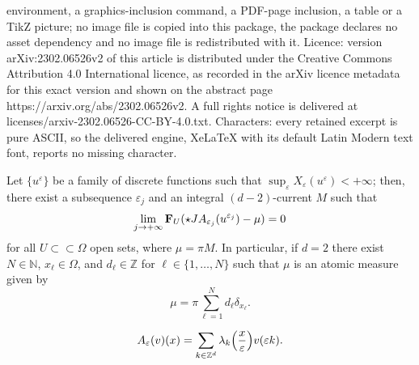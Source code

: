 \documentclass[10pt,a4paper]{amsart}
\def\e{\varepsilon}
\begin{document}
environment, a graphics-inclusion command, a PDF-page inclusion, a table or a TikZ picture; no image file is copied into this package, the package declares no asset dependency and no image file is redistributed with it. Licence: version arXiv:2302.06526v2 of this article is distributed under the Creative Commons Attribution 4.0 International licence, as recorded in the arXiv licence metadata for this exact version and shown on the abstract page https://arxiv.org/abs/2302.06526v2. A full rights notice is delivered at licenses/arxiv-2302.06526-CC-BY-4.0.txt. Characters: every retained excerpt is pure ASCII, so the delivered engine, XeLaTeX with its default Latin Modern text font, reports no missing character.
\begin{lemma} \label{lemma2}
Let $\{u^\e\}$ be a family of discrete functions such that $\sup_\e X_\e(u^\e)<+\infty$; then, there exist a subsequence $\e_j$ and an integral $(d-2)$-current $M$   
such that 
\begin{equation}\label{codico}
\lim_{j\to +\infty}{\bf F}_U(\star JA_{\e_j}(u^{\e_j})-\mu)=0 
\end{equation}
for all $U\subset\subset\Omega$ open sets, where $\mu=\pi M$. 
In particular, if $d=2$ there exist $N\in \mathbb N$, $x_\ell\in \Omega$, and $d_\ell\in\mathbb Z$ for $\ell\in\{1,\ldots,N\}$ such that $\mu$ is an atomic measure given by 
$$\mu=\pi\sum_{\ell=1}^N d_\ell \delta_{x_\ell}.$$ 
\end{lemma}

\begin{equation}\label{def-ae}
A_\e(v)(x)=\sum_{k\in\mathbb Z^d}\lambda_k\Big({x\over\e}\Big) v(\e k). 
\end{equation} 
\end{document}
